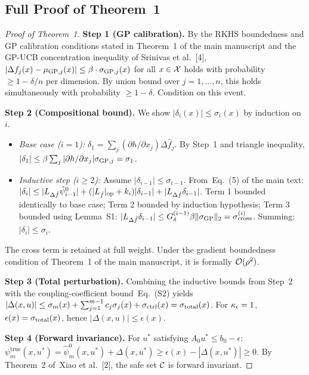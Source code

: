 \subsection{Full Proof of Theorem~1}

\begin{proof}[Proof of Theorem~1]
\textbf{Step 1 (GP calibration).} By the RKHS boundedness and GP calibration conditions stated in Theorem~1 of the main manuscript and the GP-UCB concentration inequality of Srinivas et al.\ [4], $|\Delta f_j(x) - \mu_{\mathrm{GP},j}(x)| \leq \beta \cdot \sigma_{\mathrm{GP},j}(x)$ for all $x \in \mathcal{X}$ holds with probability $\geq 1 - \delta/n$ per dimension. By union bound over $j = 1,\ldots,n$, this holds simultaneously with probability $\geq 1 - \delta$. Condition on this event.

\textbf{Step 2 (Compositional bound).} We show $|\delta_i(x)| \leq \sigma_i(x)$ by induction on $i$.
\begin{itemize}
    \item \emph{Base case ($i=1$):} $\delta_1 = \sum_j (\partial h/\partial x_j) \Delta \hat{f}_j$. By Step~1 and triangle inequality, $|\delta_1| \leq \beta \sum_j |\partial h/\partial x_j| \sigma_{\mathrm{GP},j} = \sigma_1$.
    \item \emph{Inductive step ($i \geq 2$):} Assume $|\delta_{i-1}| \leq \sigma_{i-1}$. From~Eq.~(5) of the main text: $|\delta_i| \leq |L_{\Delta \hat{f}} \hat{\psi}_{i-1}^0| + (|L_{\hat{f}}|_{\mathrm{op}} + k_i)|\delta_{i-1}| + |L_{\Delta \hat{f}} \delta_{i-1}|$. Term 1 bounded identically to base case; Term 2 bounded by induction hypothesis; Term 3 bounded using Lemma~S1: $|L_{\Delta \hat{f}} \delta_{i-1}| \leq G_\delta^{(i-1)} \beta \|\sigma_{\mathrm{GP}}\|_2 = \sigma_{\mathrm{cross}}^{(i)}$. Summing: $|\delta_i| \leq \sigma_i$.
\end{itemize}
The cross term is retained at full weight. Under the gradient boundedness condition of Theorem~1 of the main manuscript, it is formally $\mathcal{O}(\rho^2)$.

\textbf{Step 3 (Total perturbation).} Combining the inductive bounds from Step~2 with the coupling-coefficient bound~Eq.~(S2) yields $|\Delta(x,u)| \leq \sigma_m(x) + \sum_{j=1}^{m-1} c_j \sigma_j(x) + \sigma_{\mathrm{ctrl}}(x) = \sigma_{\mathrm{total}}(x)$. For $\kappa_\epsilon = 1$, $\epsilon(x) = \sigma_{\mathrm{total}}(x)$, hence $|\Delta(x,u)| \leq \epsilon(x)$.

\textbf{Step 4 (Forward invariance).} For $u^*$ satisfying $A_0 u^* \leq b_0 - \epsilon$: $\psi_m^{\mathrm{true}}(x,u^*) = \hat{\psi}_m^0(x,u^*) + \Delta(x,u^*) \geq \epsilon(x) - |\Delta(x,u^*)| \geq 0$. By Theorem~2 of~Xiao et al.\ [2], the safe set $\mathcal{C}$ is forward invariant.
\end{proof}

